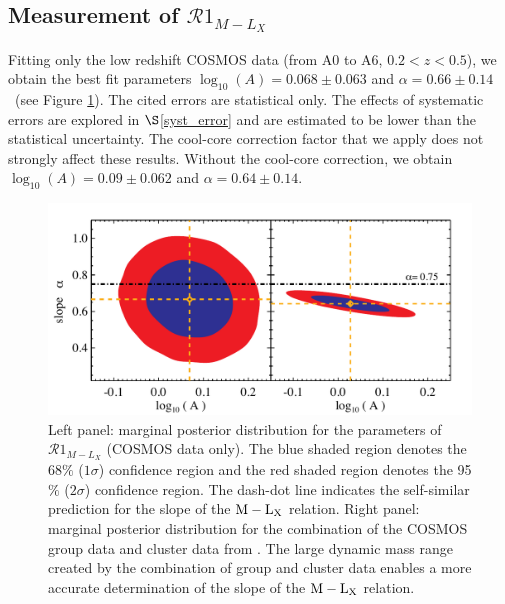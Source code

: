 \documentclass[12pt]{emulateapj}
\newcommand{\mlx}{$\rm{M} - \rm{L}_{\rm X}$ }
\newcommand{\cosalpha}{$\alpha=0.66 \pm 0.14$}   %
\begin{document}
\subsection{Measurement of  $\mathcal{R}1_{M-L_{X}}$}\label{lxm_relation1}

Fitting only the low redshift COSMOS data (from A0 to A6,
$0.2<z<0.5$), we obtain the best fit parameters $\log_{10}(A)=0.068
\pm 0.063$ and \cosalpha\ (see Figure \ref{lxm_a_alpha}). The cited
errors are statistical only. The effects of systematic errors are
explored in $\S$\ref{syst_error} and are estimated to be lower than
the statistical uncertainty. The cool-core correction factor that we
apply does not strongly affect these results. Without the cool-core
correction, we obtain $\log_{10}(A)=0.09 \pm 0.062$ and $\alpha=0.64
\pm 0.14$.

\begin{figure}
\centerline{\includegraphics[scale=0.47]{figure5.pdf}}
\caption{Left panel: marginal posterior distribution for the
  parameters of $\mathcal{R}1_{M-L_{X}}$ (COSMOS data only). The blue
  shaded region denotes the 68$\%$ ($1 \sigma$) confidence region and
  the red shaded region denotes the 95$\%$ ($2 \sigma$) confidence
  region. The dash-dot line indicates the self-similar prediction for
  the slope of the \mlx relation. Right panel: marginal posterior
  distribution for the combination of the COSMOS group data and
  cluster data from \protect\citet{Hoekstra:2007}. The large dynamic
  mass range created by the combination of group and cluster data
  enables a more accurate determination of the slope of the \mlx
  relation.\vspace{0.05 in}}
\label{lxm_a_alpha}
\end{figure}
\end{document}
